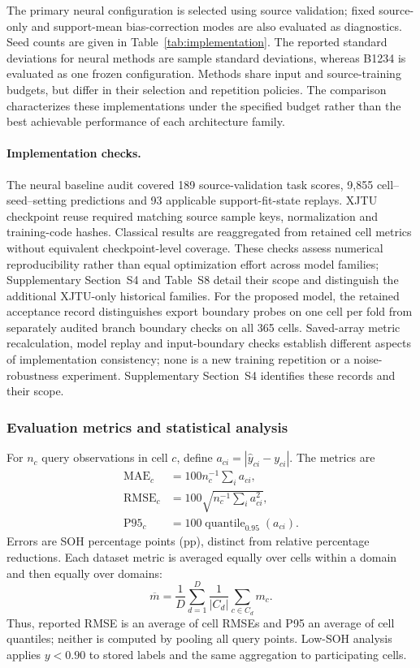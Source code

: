 \documentclass[preprint,12pt]{elsarticle}
\begin{document}


The primary neural configuration is selected using source validation; fixed source-only and support-mean bias-correction modes are also evaluated as diagnostics. Seed counts are given in Table~\ref{tab:implementation}. The reported standard deviations for neural methods are sample standard deviations, whereas B1234 is evaluated as one frozen configuration. Methods share input and source-training budgets, but differ in their selection and repetition policies. The comparison characterizes these implementations under the specified budget rather than the best achievable performance of each architecture family.

\paragraph{Implementation checks.}
The neural baseline audit covered 189 source-validation task scores, 9,855 cell--seed--setting predictions and 93 applicable support-fit-state replays. XJTU checkpoint reuse required matching source sample keys, normalization and training-code hashes. Classical results are reaggregated from retained cell metrics without equivalent checkpoint-level coverage. These checks assess numerical reproducibility rather than equal optimization effort across model families; Supplementary Section~S4 and Table~S8 detail their scope and distinguish the additional XJTU-only historical families. For the proposed model, the retained acceptance record distinguishes export boundary probes on one cell per fold from separately audited branch boundary checks on all 365 cells. Saved-array metric recalculation, model replay and input-boundary checks establish different aspects of implementation consistency; none is a new training repetition or a noise-robustness experiment. Supplementary Section~S4 identifies these records and their scope.

\subsubsection{Evaluation metrics and statistical analysis}
For $n_c$ query observations in cell $c$, define $a_{ci}=|\widehat y_{ci}-y_{ci}|$. The metrics are
\begin{align}
\mathrm{MAE}_c&=100n_c^{-1}\sum_i a_{ci},\\
\mathrm{RMSE}_c&=100\sqrt{n_c^{-1}\sum_i a_{ci}^2},\\
\mathrm{P95}_c&=100\operatorname{quantile}_{0.95}(a_{ci}).
\end{align}
Errors are SOH percentage points (pp), distinct from relative percentage reductions. Each dataset metric is averaged equally over cells within a domain and then equally over domains:
\begin{equation}
\overline m=\frac{1}{D}\sum_{d=1}^{D}\frac{1}{|C_d|}\sum_{c\in C_d}m_c.
\label{eq:aggregation}
\end{equation}
Thus, reported RMSE is an average of cell RMSEs and P95 an average of cell quantiles; neither is computed by pooling all query points. Low-SOH analysis applies $y<0.90$ to stored labels and the same aggregation to participating cells.
\end{document}
